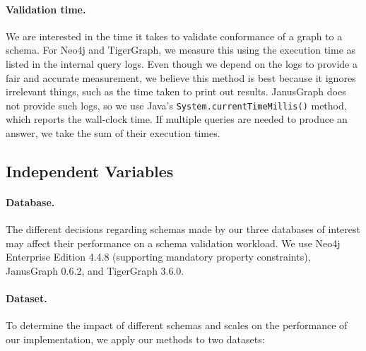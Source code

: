 \documentclass{report}
\theoremstyle{definition}
\begin{document}
\paragraph{Validation time.} We are interested in the time it takes to validate conformance of a graph to a schema. For Neo4j and TigerGraph, we measure this using the execution time as listed in the internal query logs. Even though we depend on the logs to provide a fair and accurate measurement, we believe this method is best because it ignores irrelevant things, such as the time taken to print out results. JanusGraph does not provide such logs, so we use Java's \texttt{System.currentTimeMillis()} method, which reports the wall-clock time. If multiple queries are needed to produce an answer, we take the sum of their execution times.

\subsection{Independent Variables}

\paragraph{Database.} The different decisions regarding schemas made by our three databases of interest may affect their performance on a schema validation workload. We use Neo4j Enterprise Edition 4.4.8 (supporting mandatory property constraints), JanusGraph 0.6.2, and TigerGraph 3.6.0.

\paragraph{Dataset.} To determine the impact of different schemas and scales on the performance of our implementation, we apply our methods to two datasets:
\end{document}
